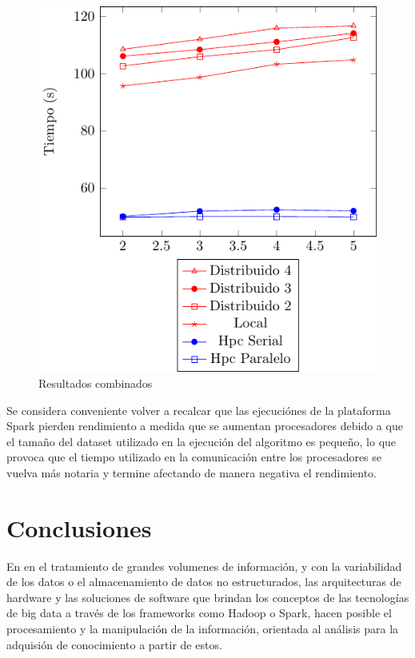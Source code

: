 \documentclass[conference,compsoc]{IEEEtran}
\begin{document}
\begin{figure}[H]
    \centering
    \includegraphics[scale=1]{ResultsCombined.pdf}
    \caption{Resultados combinados}
    \label{plot:compar}
\end{figure}

Se considera conveniente volver a recalcar que las ejecuciónes de la plataforma
Spark pierden rendimiento a medida que se aumentan procesadores debido a que el
tamaño del dataset utilizado en la ejecución del algoritmo es pequeño, lo que
provoca que el tiempo utilizado en la comunicación entre los procesadores se
vuelva más notaria y termine afectando de manera negativa el rendimiento.

\section{Conclusiones}
En en el tratamiento de grandes volumenes de información, y con la variabilidad de los datos o el almacenamiento de datos no estructurados, las arquitecturas de hardware y las soluciones de software que brindan los conceptos de las tecnologías de big data a través de los frameworks como Hadoop o Spark, hacen posible el procesamiento y la manipulación de la información, orientada al análisis para la adquisión de conocimiento a partir de estos.\\
\end{document}
